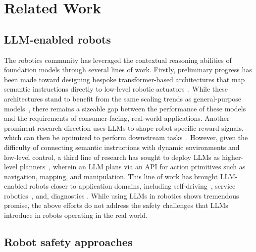 
\section{Related Work}
\label{sec:related-work}



\subsection{LLM-enabled robots}

The robotics community has leveraged the contextual reasoning abilities of foundation models through several lines of work. Firstly, preliminary progress has been made toward designing bespoke transformer-based architectures that map semantic instructions directly to low-level robotic actuators~\cite{black2024pi_0,li2024cogact,kim2024openvla,brohan2023rt}.  While these architectures stand to benefit from the same scaling trends as general-purpose models~\cite{sartor2024neural,pearce2024scaling}, there remains a sizeable gap between the performance of these models and the requirements of consumer-facing, real-world applications.  
Another prominent research direction uses LLMs to shape robot-specific reward signals, which can then be optimized to perform downstream tasks~\cite{ma2023eureka, ma2024dreureka, yu2023language, kwon2023reward}.  
However, given the difficulty of connecting semantic instructions with dynamic environments and low-level control, 
a third line of research has sought to deploy LLMs as higher-level planners~\cite{liang2023code,ahn2022can}, wherein an LLM plans via an API for action primitives such as navigation, mapping, and manipulation. 
This line of work has brought LLM-enabled robots closer to application domains, including self-driving~\cite{li2024driving, schumann-2023-velma, sharan2023llm}, service robotics~\cite{rana2023sayplan, llm_service_robot, momallm24, huang2022inner}, and, diagnostics \cite{tagliabue2023realresilienceadaptationusing, fan2024learning, SinhaElhafsiEtAl2024Aesop}. 
While using LLMs in robotics shows tremendous promise, the above efforts do not address the safety challenges that LLMs introduce in robots operating in the real world.

\subsection{Robot safety approaches}

